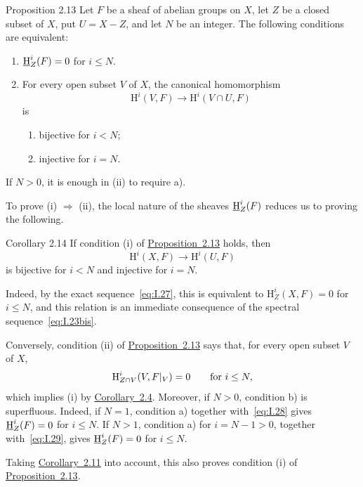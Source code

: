 \begin{sgastatement}{Proposition 2.13}
Let $F$ be a sheaf of abelian groups on $X$, let $Z$ be a closed subset of
$X$, put $U=X-Z$, and let $N$ be an integer. The following conditions are
equivalent:
\begin{enumerate}[label=\textup{(\roman*)},leftmargin=2.7em]
  \item $\mathop{\underline{\mathrm H}}\nolimits_Z^i(F)=0$ for $i\le N$.
  \item For every open subset $V$ of $X$, the canonical homomorphism
  \[
    \mathrm H^i(V,F)\longrightarrow\mathrm H^i(V\cap U,F)
  \]
  is
  \begin{enumerate}[label=\textup{\alph*)},leftmargin=2.5em]
    \item bijective for $i<N$;
    \item injective for $i=N$.
  \end{enumerate}
\end{enumerate}
If $N>0$, it is enough in \textup{(ii)} to require \textup{a)}.
\end{sgastatement}

To prove \textup{(i)} $\Rightarrow$ \textup{(ii)}, the local nature of the
sheaves $\mathop{\underline{\mathrm H}}\nolimits_Z^i(F)$ reduces us to proving the following.

\begin{sgastatement}{Corollary 2.14}
If condition \textup{(i)} of \hyperref[I.2.13]{Proposition~2.13} holds, then
\[
  \mathrm H^i(X,F)\longrightarrow\mathrm H^i(U,F)
\]
is bijective for $i<N$ and injective for $i=N$.
\end{sgastatement}

Indeed, by the exact sequence~\eqref{eq:I.27}, this is equivalent to
$\mathrm H_Z^i(X,F)=0$ for $i\le N$, and this relation is an
immediate consequence of the spectral sequence~\eqref{eq:I.23bis}.

Conversely, condition \textup{(ii)} of \hyperref[I.2.13]{Proposition~2.13} says that, for every
open subset $V$ of $X$,
\[
  \mathrm H_{Z\cap V}^i(V,F\vert_{V})=0
  \qquad\text{for }i\le N,
\]
which implies \textup{(i)} by \hyperref[I.2.4]{Corollary~2.4}. Moreover, if $N>0$, condition
\textup{b)} is superfluous. Indeed, if $N=1$, condition \textup{a)} together
with~\eqref{eq:I.28} gives $\mathop{\underline{\mathrm H}}\nolimits_Z^i(F)=0$ for $i\le N$. If $N>1$,
condition \textup{a)} for $i=N-1>0$, together with~\eqref{eq:I.29}, gives
$\mathop{\underline{\mathrm H}}\nolimits_Z^i(F)=0$ for $i\le N$.

Taking \hyperref[I.2.11]{Corollary~2.11} into account, this also proves condition \textup{(i)}
of \hyperref[I.2.13]{Proposition~2.13}.

